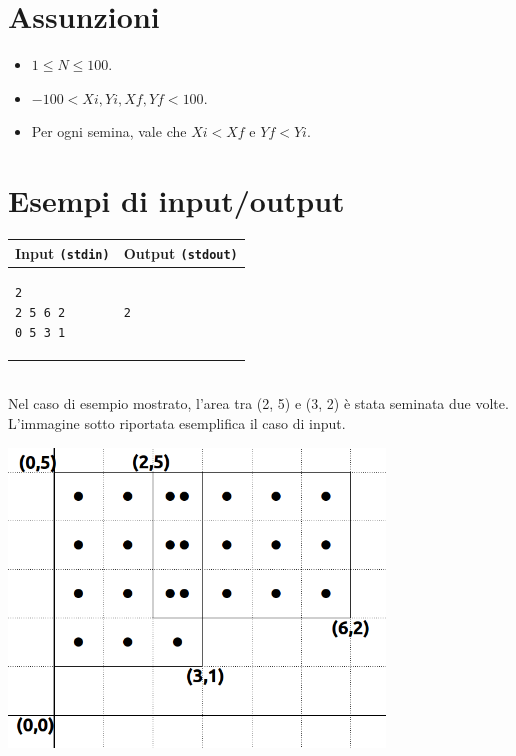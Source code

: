 \documentclass[a4paper,11pt]{article}
\begin{document}
  \section*{Assunzioni}
  \begin{itemize}
  \item $1 \leq N \leq 100$.
  \item $-100 < Xi, Yi, Xf, Yf < 100$.
\item Per ogni semina, vale che $Xi < Xf$ e $Yf < Yi$.

  \end{itemize}

\section*{Esempi di input/output}

  
    \noindent
    \begin{tabular}{p{8cm}|p{8cm}}
    \toprule
    \textbf{Input \texttt{(stdin)}}
    & \textbf{Output \texttt{(stdout)}}
    \\
    \midrule
    \small
    \begin{verbatim}
2
2 5 6 2
0 5 3 1
      \end{verbatim}
    &
    \small
    \begin{verbatim}
2
\end{verbatim}
    \\
    \bottomrule
    \end{tabular} \\[12pt]
Nel caso di esempio mostrato, l'area tra (2, 5) e (3, 2) è stata seminata due volte.\\
L'immagine sotto riportata esemplifica il caso di input.\\[1cm]
\centerline{\includegraphics[width=10cm]{image.png}}
\end{document}
